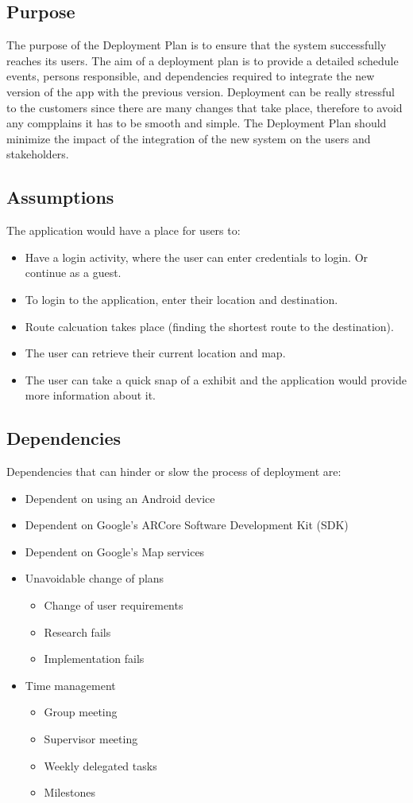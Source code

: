 \documentclass[12pt]{article}
\begin{document}
\subsection{Purpose}
The purpose of the Deployment Plan is to ensure that the system successfully reaches its users.
The aim of a deployment plan is to provide  a detailed schedule events, persons responsible, and dependencies required to integrate the new version of the app with the previous version.
Deployment can be really stressful to the customers since there are many changes that take place, therefore to avoid any compplains it has to be smooth and simple. The Deployment Plan should minimize the impact of the integration of the new system on the users and stakeholders.
\subsection{Assumptions}
The application would have a place for users to:
\begin{itemize}
    \item Have a login activity, where the user can enter credentials to login. Or continue as a guest.
    \item To login to the application, enter their location and destination.
    \item Route calcuation takes place (finding the shortest route to the destination).
    \item The user can retrieve their current location and map.
    \item The user can take a quick snap of a exhibit and the application would provide more information about it.
\end{itemize}
\subsection{Dependencies}
Dependencies that can hinder or slow the process of deployment are:
\begin{itemize}
    \item Dependent on using an Android device
    \item Dependent on Google's ARCore Software Development Kit (SDK)
    \item Dependent on Google's Map services
    \item Unavoidable change of plans
    \begin{itemize}
        \item Change of user requirements
        \item Research fails
        \item Implementation fails
    \end{itemize}
    \item Time management
    \begin{itemize}
        \item Group meeting
        \item Supervisor meeting
        \item Weekly delegated tasks
        \item Milestones
    \end{itemize}
\end{itemize}
\end{document}
